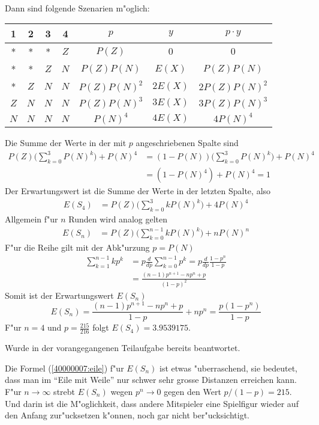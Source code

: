 \begin{loesung}
\begin{teilaufgaben}
\begin{align*}
\end{align*}
Dann sind folgende Szenarien m"oglich:
\begin{center}
\begin{tabular}{|cccc|c|c|c|}
\hline
1&2&3&4&$p$&$y$&$p\cdot y$\\
\hline
 * & * & * &$Z$&$P(Z)$&$0$&$0$\\
 * & * &$Z$&$N$&$P(Z)P(N)$&$E(X)$&$P(Z)P(N)$\\
 * &$Z$&$N$&$N$&$P(Z)P(N)^2$&$2E(X)$&$2P(Z)P(N)^2$\\
$Z$&$N$&$N$&$N$&$P(Z)P(N)^3$&$3E(X)$&$3P(Z)P(N)^3$\\
$N$&$N$&$N$&$N$&$P(N)^4$&$4E(X)$&$4    P(N)^4$\\
\hline
\end{tabular}
\end{center}
Die Summe der Werte in der mit $p$ angeschriebenen Spalte sind
\begin{align*}
P(Z)\biggl(\sum_{k=0}^3 P(N)^k\biggr) + P(N)^4
&=
(1-P(N))\biggl(\sum_{k=0}^3 P(N)^k\biggr) + P(N)^4\\
&=
(1-P(N)^4) + P(N)^4
=1
\end{align*}
Der Erwartungswert ist die Summe der Werte in der letzten
Spalte, also
\begin{align*}
E(S_4)
&=
P(Z)\biggl(\sum_{k=0}^3kP(N)^k\biggr)+4P(N)^4
\end{align*}
Allgemein f"ur $n$ Runden wird analog gelten
\begin{align*}
E(S_n)&=P(Z)\biggl(\sum_{k=0}^{n-1} kP(N)^k\biggr) + nP(N)^n
\end{align*}
F"ur die Reihe gilt mit der Abk"urzung $p=P(N)$
\begin{align*}
\sum_{k=1}^{n-1}kp^k
&=p\frac{d}{dp}\sum_{k=0}^{n-1}p^k
 =p\frac{d}{dp}\frac{1-p^n}{1-p}\\
&= \frac{(n-1) p^{n+1}-n p^n+p}{(1-p)^2}
\end{align*}
Somit ist der Erwartungswert $E(S_n)$
\begin{equation}
E(S_n)
=
\frac{(n-1) p^{n+1}-n p^n+p}{1-p}+np^n
=\frac{p(1-p^n)}{1-p}
\label{40000007:eile}
\end{equation}
F"ur $n=4$ und $p=\frac{215}{216}$ folgt
$
E(S_4)=
3.9539175
$.
\item Wurde in der vorangegangenen Teilaufgabe bereits
beantwortet.
\end{teilaufgaben}
Die Formel (\ref{40000007:eile}) f"ur $E(S_n)$ ist etwas "uberraschend,
sie bedeutet,
dass man im ``Eile mit Weile'' nur schwer sehr grosse Distanzen
erreichen kann. F"ur $n\to\infty$ strebt $E(S_n)$
wegen $p^n\to 0$ gegen den Wert $p/(1-p)=215$.  Und darin ist die
M"oglichkeit, dass andere Mitspieler eine Spielfigur wieder auf den
Anfang zur"ucksetzen k"onnen, noch gar nicht ber"ucksichtigt.
\end{loesung}

